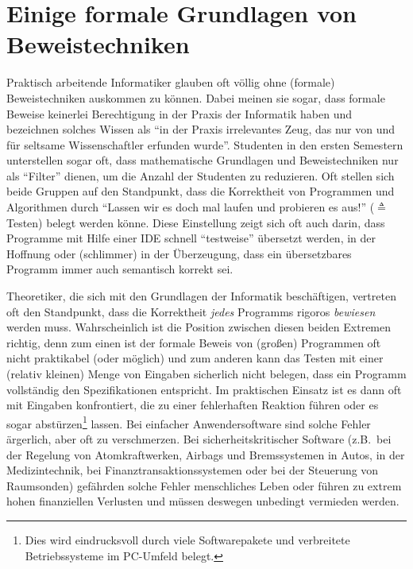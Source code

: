 \section{Einige formale Grundlagen von Beweistechniken}
\label{sec:proof}
Praktisch arbeitende Informatiker glauben oft völlig ohne (formale)
Beweistechniken auskommen zu können. Dabei meinen sie sogar, dass
formale Beweise keinerlei Berechtigung in der Praxis der Informatik
haben und bezeichnen solches Wissen als "`in der Praxis irrelevantes
Zeug, das nur von und für seltsame Wissenschaftler erfunden
wurde"'. Studenten in den ersten Semestern unterstellen sogar oft,
dass mathematische Grundlagen und Beweistechniken nur als "`Filter"'
dienen, um die Anzahl der Studenten zu reduzieren. Oft stellen sich
beide Gruppen auf den Standpunkt, dass die Korrektheit von
Programmen und Algorithmen durch "`Lassen wir es doch mal laufen und
probieren es aus!"' ($\triangleq$ Testen) belegt werden könne. Diese
Einstellung zeigt sich oft auch darin, dass Programme mit Hilfe einer
IDE schnell "`testweise"' übersetzt werden, in der Hoffnung oder
(schlimmer) in der Überzeugung, dass ein übersetzbares Programm immer
auch semantisch korrekt sei.

Theoretiker, die sich mit den Grundlagen der Informatik beschäftigen,
vertreten oft den Standpunkt, dass die Korrektheit \emph{jedes}
Programms rigoros \emph{bewiesen} werden muss. Wahrscheinlich ist die
Position zwischen diesen beiden Extremen richtig, denn zum einen ist
der formale Beweis von (großen) Programmen oft nicht praktikabel (oder
möglich) und zum anderen kann das Testen mit einer (relativ kleinen)
Menge von Eingaben sicherlich nicht belegen, dass ein Programm
vollständig den Spezifikationen entspricht. Im praktischen Einsatz ist
es dann oft mit Eingaben konfrontiert, die zu einer fehlerhaften
Reaktion führen oder es sogar abstürzen\footnote{Dies wird
eindrucksvoll durch viele Softwarepakete und verbreitete
Betriebssysteme im PC-Umfeld belegt.} lassen. Bei einfacher
Anwendersoftware sind solche Fehler ärgerlich, aber oft zu
verschmerzen. Bei sicherheitskritischer Software (z.B.~bei der
Regelung von Atomkraftwerken, Airbags und Bremssystemen in Autos, in
der Medizintechnik, bei Finanztransaktionssystemen oder bei der 
Steuerung von Raumsonden) gefährden solche Fehler menschliches 
Leben oder führen zu extrem hohen finanziellen Verlusten und müssen 
deswegen unbedingt vermieden werden.

